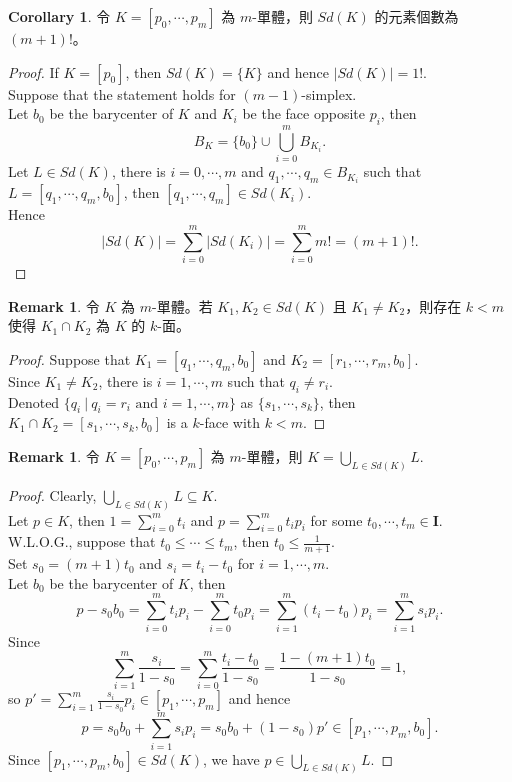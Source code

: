 \documentclass[12pt]{article}
\theoremstyle{definition}
\newtheorem{remark}[definition]{Remark}
\newtheorem{corollary}[definition]{Corollary}
\newcommand\<{\langle}
\renewcommand\>{\rangle}
\begin{document}
\begin{CJK}{UTF8}{bsmi}
\begin{corollary}
    令 $K=[p_0, \cdots, p_m]$ 為 $m$-單體，則 $Sd(K)$ 的元素個數為 $(m+1)!$。
\end{corollary}
\begin{proof}
    If $K=[p_0]$, then $Sd(K)=\{K\}$ and hence $|Sd(K)|=1!$. \\
    Suppose that the statement holds for $(m-1)$-simplex. \\
    Let $b_0$ be the barycenter of $K$ and $K_i$ be the face opposite $p_i$, then
    \[
        B_K = \{b_0\}\cup\bigcup_{i=0}^m B_{K_i}.
    \]
    Let $L\in Sd(K)$, there is $i=0, \cdots, m$ and $q_1, \cdots, q_m\in B_{K_i}$ such that $L=[q_1, \cdots, q_m, b_0]$, then $[q_1, \cdots, q_m]\in Sd(K_i)$. \\
    Hence
    \[
        |Sd(K)| 
        = \sum_{i=0}^m |Sd(K_i)|
        = \sum_{i=0}^m m!
        = (m+1)!.
    \]
\end{proof}

\begin{remark}
    令 $K$ 為 $m$-單體。若 $K_1, K_2\in Sd(K)$ 且 $K_1\ne K_2$，則存在 $k<m$ 使得 $K_1\cap K_2$ 為 $K$ 的 $k$-面。
\end{remark}
\begin{proof}
    Suppose that $K_1=[q_1, \cdots, q_m, b_0]$ and $K_2=[r_1, \cdots, r_m, b_0]$. \\
    Since $K_1\ne K_2$, there is $i=1, \cdots, m$ such that $q_i\ne r_i$. \\
    Denoted $\{q_i\ |\ q_i=r_i\text{ and }i=1, \cdots, m\}$ as $\{s_1, \cdots, s_k\}$, then $K_1\cap K_2=[s_1, \cdots, s_k, b_0]$ is a $k$-face with $k<m$.
\end{proof}

\begin{remark}
    令 $K=[p_0, \cdots, p_m]$ 為 $m$-單體，則 $K=\bigcup_{L\in Sd(K)}L$.
\end{remark}
\begin{proof}
    Clearly, $\bigcup_{L\in Sd(K)}L\subseteq K$. \\
    Let $p\in K$, then $1=\sum_{i=0}^m t_i$ and $p=\sum_{i=0}^m t_i p_i$ for some $t_0, \cdots, t_m\in\textbf{I}$. \\
    W.L.O.G., suppose that $t_0\le\cdots\le t_m$, then $t_0\le\frac{1}{m+1}$. \\
    Set $s_0=(m+1)t_0$ and $s_i=t_i-t_0$ for $i=1, \cdots, m$. \\
    Let $b_0$ be the barycenter of $K$, then
    \[
        p - s_0 b_0
        = \sum_{i=0}^m t_i p_i - \sum_{i=0}^m t_0 p_i
        = \sum_{i=1}^m (t_i-t_0) p_i
        = \sum_{i=1}^m s_i p_i.
    \]
    Since
    \[
        \sum_{i=1}^m \frac{s_i}{1 - s_0}
        = \sum_{i=0}^m \frac{t_i-t_0}{1 - s_0}
        = \frac{1 - (m+1)t_0}{1 - s_0}
        = 1,
    \]
    so $p'=\sum_{i=1}^m \frac{s_i}{1-s_0} p_i\in[p_1, \cdots, p_m]$ and hence
    \[
        p
        = s_0 b_0 + \sum_{i=1}^m s_i p_i
        = s_0 b_0 + (1-s_0)p'
        \in [p_1, \cdots, p_m, b_0].
    \]
    Since $[p_1, \cdots, p_m, b_0]\in Sd(K)$, we have $p\in\bigcup_{L\in Sd(K)}L$.
\end{proof}


\end{CJK}
\end{document}
